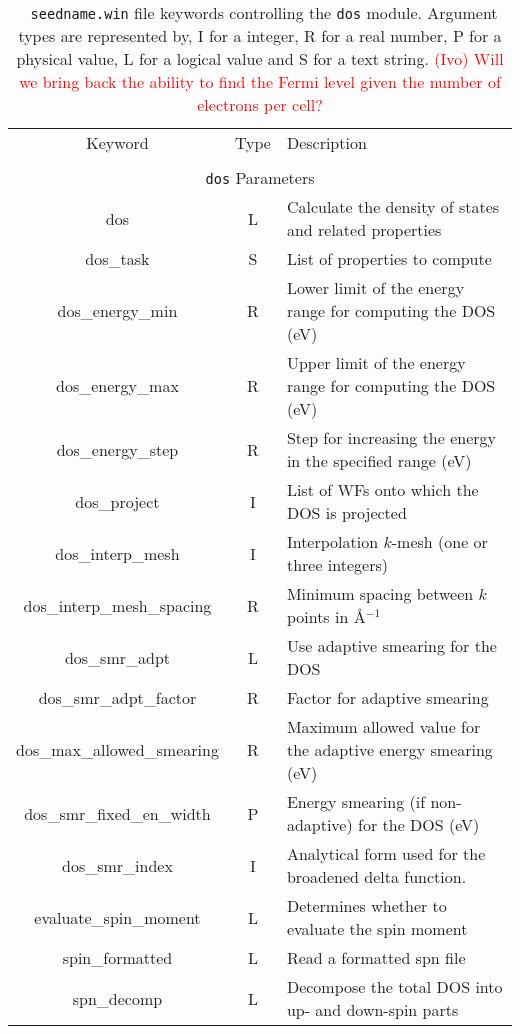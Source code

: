 \begin{table}[hH!]
\begin{center}
\begin{tabular}{|c|c|p{6cm}|}
  \hline
  Keyword & Type & Description \\
  &      &             \\
  \hline\hline
  \multicolumn{3}{|c|}{{\tt dos} Parameters} \\
  \hline
  {\sc dos}  & L & Calculate the density of states and related properties\\
  {\sc dos\_task}& S  & List of properties to compute \\
  {\sc dos\_energy\_min} & R & Lower limit of the energy range for
  computing the DOS (eV)\\
  {\sc dos\_energy\_max}& R & Upper limit of the energy range for
  computing the DOS (eV)\\
  {\sc dos\_energy\_step}& R & Step for increasing the energy in the specified range (eV)\\
  {\sc dos\_project}& I & List of WFs onto which the DOS is projected\\
  {\sc dos\_interp\_mesh} & I & Interpolation $k$-mesh (one or three integers)\\ 
  {\sc dos\_interp\_mesh\_spacing}& R & Minimum spacing between $k$ points in \AA$^{-1}$\\
  {\sc dos\_smr\_adpt} & L & Use adaptive smearing for the DOS \\
  {\sc dos\_smr\_adpt\_factor} & R & Factor for adaptive smearing \\
  {\sc dos\_max\_allowed\_smearing} & R & Maximum allowed value for the adaptive energy smearing (eV) \\
  {\sc dos\_smr\_fixed\_en\_width} & P  & Energy smearing (if non-adaptive) for the DOS (eV) \\   
{\sc dos\_smr\_index} & I & Analytical form used for the broadened delta function. \\
  {\sc evaluate\_spin\_moment}& L & Determines whether to evaluate the spin moment\\
  {\sc spin\_formatted}& L & Read a formatted spn file\\
  {\sc spn\_decomp}& L & Decompose the total DOS into
  up- and down-spin parts\\
  \hline
\end{tabular}
\caption[Parameter file keywords controlling the DOS module.]  {{\tt
    seedname.win} file keywords controlling the {\tt dos}
  module. Argument types are represented by, I for a integer, R for a
  real number, P for a physical value, L for a logical value and S for
  a text string.  \textcolor{red}{(Ivo) Will we bring back the ability
    to find the Fermi level given the number of electrons per cell?}
}
\label{parameter_keywords_dos}
\end{center}
\end{table}


